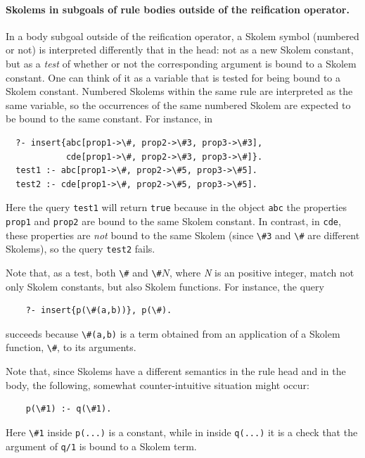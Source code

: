 \documentclass[11pt]{article}
\newcommand{\bs}{\textbackslash}
\begin{document}
\paragraph{Skolems in subgoals of rule bodies outside of the reification operator.}
In a body subgoal outside of the reification operator, a Skolem
symbol (numbered or not) is interpreted differently that in the head: not
as a new  Skolem constant,
but as a \emph{test} of whether or not the
corresponding argument is bound to a Skolem constant. One can think of it
as a variable that is tested for being bound to a Skolem constant.
Numbered Skolems within the same rule are interpreted as the same variable,
so the occurrences of the same numbered Skolem are expected to be bound to
the same constant. For instance, in
\begin{verbatim}
  ?- insert{abc[prop1->\#, prop2->\#3, prop3->\#3],
            cde[prop1->\#, prop2->\#3, prop3->\#]}.
  test1 :- abc[prop1->\#, prop2->\#5, prop3->\#5].
  test2 :- cde[prop1->\#, prop2->\#5, prop3->\#5].
\end{verbatim}
Here the query \texttt{test1} will return \texttt{true} because in the
object \texttt{abc} the properties \texttt{prop1} and \texttt{prop2} are
bound to the same Skolem constant. In contrast, in \texttt{cde}, these
properties are \emph{not} bound to the same Skolem (since \texttt{\bs{}\#3} and
\texttt{\bs{}\#} are different Skolems), so the query \texttt{test2} fails. 

Note that, as a test, both \texttt{\bs{}\#} and \texttt{\bs{}\#}$N$, where
\emph{N} is an positive integer, match not only Skolem constants, but also
Skolem functions. For instance, the query
\begin{verbatim}
    ?- insert{p(\#(a,b))}, p(\#).
\end{verbatim}
succeeds because \verb|\#(a,b)| is a term obtained from an application of a
Skolem function, \verb|\#|, to its arguments.

Note that, since Skolems have a different semantics in the rule head and in
the body, the following, somewhat counter-intuitive situation might occur:
\begin{verbatim}
    p(\#1) :- q(\#1).
\end{verbatim}
Here \texttt{\bs{}\#1} inside \texttt{p(...)}  is a constant, while in 
inside \texttt{q(...)} it is a check that the argument of \texttt{q/1} is
bound to a Skolem term.  
\end{document}
